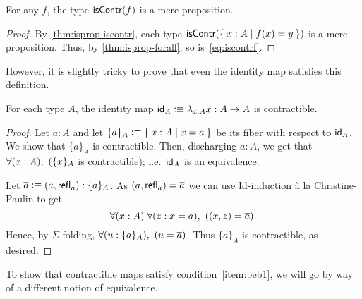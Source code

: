 \begin{lem}\label{thm:contr-hprop}
  For any $f$, the type $\iscontr(f)$ is a mere proposition.
\end{lem}
\begin{proof}
  By \autoref{thm:isprop-iscontr}, each type $\iscontr (\setof{x:A | f(x) = y})$ is a mere proposition.
  Thus, by \autoref{thm:isprop-forall}, so is~\eqref{eq:iscontrf}.
\end{proof}

However, it is slightly tricky to prove that even the identity map satisfies this definition.

\begin{lem}\label{lem:id-map}
For each type $A$, the identity map $\idfunc[A]\defeq \lambda_{x:A}x :A\ra A$ is contractible.
\end{lem}
\begin{proof}
  Let $a:A$ and let $\{a\}_A\defeq \setof{ x:A | x=a }$ be its fiber with respect to $\idfunc[A]$.
  We show that $\{ a\}_A$ is contractible.
  Then, discharging $a:A$, we get that $\fall{x:A} (\{ x\}_A$ is contractible); i.e.\ $\idfunc[A]$ is an equivalence.

  Let $\oa \defeq (a,\refl{a}):\{ a\}_A$.  As $(a,\refl{a}) = \oa$ we can use Id-induction \`{a} la Christine-Paulin to get
  \[\fall{x:A}{z:x=a} ((x,z)=\oa).\]
  Hence, by $\Sigma$-folding, $\fall{u:\{ a\}_A} (u=\oa)$.
  Thus $\{ a\}_A$ is contractible, as desired.
\end{proof}

To show that contractible maps satisfy condition~\ref{item:beb1}, we will go by way of a different notion of equivalence.





